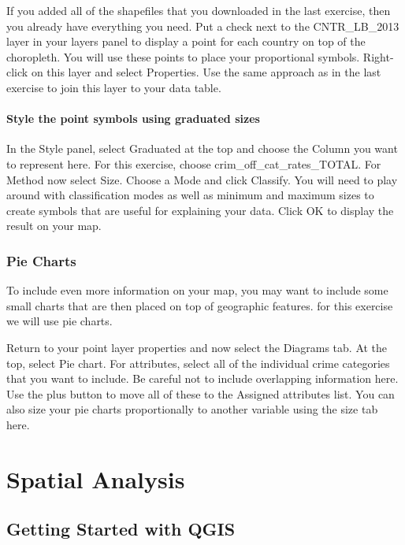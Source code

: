 \documentclass[]{book}
\begin{document}
If you added all of the shapefiles that you downloaded in the last exercise, then you already have everything you need. Put a check next to the CNTR\_LB\_2013 layer in your layers panel to display a point for each country on top of the choropleth. You will use these points to place your proportional symbols. Right-click on this layer and select Properties. Use the same approach as in the last exercise to join this layer to your data table.

\hypertarget{style-the-point-symbols-using-graduated-sizes}{%
\subsection{Style the point symbols using graduated sizes}\label{style-the-point-symbols-using-graduated-sizes}}

In the Style panel, select Graduated at the top and choose the Column you want to represent here. For this exercise, choose crim\_off\_cat\_rates\_TOTAL. For Method now select Size. Choose a Mode and click Classify. You will need to play around with classification modes as well as minimum and maximum sizes to create symbols that are useful for explaining your data. Click OK to display the result on your map.

\hypertarget{pie-charts}{%
\section{Pie Charts}\label{pie-charts}}

To include even more information on your map, you may want to include some small charts that are then placed on top of geographic features. for this exercise we will use pie charts.

Return to your point layer properties and now select the Diagrams tab. At the top, select Pie chart. For attributes, select all of the individual crime categories that you want to include. Be careful not to include overlapping information here. Use the plus button to move all of these to the Assigned attributes list. You can also size your pie charts proportionally to another variable using the size tab here.

\hypertarget{part-spatial-analysis}{%
\part{Spatial Analysis}\label{part-spatial-analysis}}

\hypertarget{getting-started-with-qgis-1}{%
\chapter{Getting Started with QGIS}\label{getting-started-with-qgis-1}}
\end{document}
